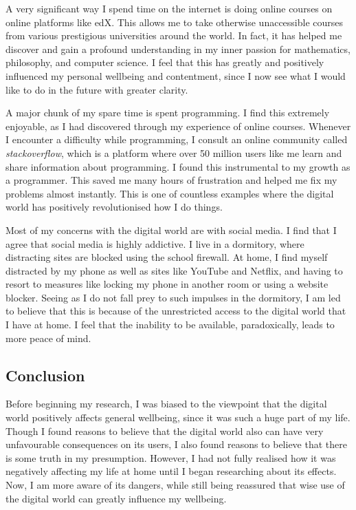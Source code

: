 \documentclass[a4paper, 11pt]{article}
\begin{document}
  A very significant way I spend time on the internet is doing online courses on online platforms like edX. This allows me to take otherwise unaccessible courses from various prestigious universities around the world. In fact, it has helped me discover and gain a profound understanding in my inner passion for mathematics, philosophy, and computer science. I feel that this has greatly and positively influenced my personal wellbeing and contentment, since I now see what I would like to do in the future with greater clarity.

  A major chunk of my spare time is spent programming. I find this extremely enjoyable, as I had discovered through my experience of online courses. Whenever I encounter a difficulty while programming, I consult an online community called \emph{stackoverflow}, which is a platform where over 50 million users like me learn and share information about programming. I found this instrumental to my growth as a programmer. This saved me many hours of frustration and helped me fix my problems almost instantly. This is one of countless examples where the digital world has positively revolutionised how I do things.

  Most of my concerns with the digital world are with social media. I find that I agree that social media is highly addictive. I live in a dormitory, where distracting sites are blocked using the school firewall. At home, I find myself distracted by my phone as well as sites like YouTube and Netflix, and having to resort to measures like locking my phone in another room or using a website blocker. Seeing as I do not fall prey to such impulses in the dormitory, I am led to believe that this is because of the unrestricted access to the digital world that I have at home. I feel that the inability to be available, paradoxically, leads to more peace of mind.

\subsection{Conclusion}

  Before beginning my research, I was biased to the viewpoint that the digital world positively affects general wellbeing, since it was such a huge part of my life. Though I found reasons to believe that the digital world also can have very unfavourable consequences on its users, I also found reasons to believe that there is some truth in my presumption. However, I had not fully realised how it was negatively affecting my life at home until I began researching about its effects. Now, I am more aware of its dangers, while still being reassured that wise use of the digital world can greatly influence my wellbeing.
\end{document}
